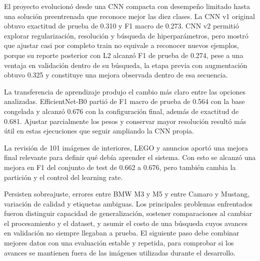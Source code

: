 \documentclass[conference]{IEEEtran}
\begin{document}
El proyecto evolucionó desde una CNN compacta con desempeño limitado hasta una solución preentrenada que reconoce mejor las diez clases. La CNN v1 original obtuvo exactitud de prueba de 0.310 y F1 macro de 0.273. CNN v2 permitió explorar regularización, resolución y búsqueda de hiperparámetros, pero mostró que ajustar casi por completo train no equivale a reconocer nuevos ejemplos, porque su reporte posterior con L2 alcanzó F1 de prueba de 0.274, pese a una ventaja en validación dentro de su búsqueda, la etapa previa con augmentación obtuvo 0.325 y constituye una mejora observada dentro de esa secuencia.

La transferencia de aprendizaje produjo el cambio más claro entre las opciones analizadas. EfficientNet-B0 partió de F1 macro de prueba de 0.564 con la base congelada y alcanzó 0.676 con la configuración final, además de exactitud de 0.681. Ajustar parcialmente los pesos y conservar mayor resolución resultó más útil en estas ejecuciones que seguir ampliando la CNN propia. 

La revisión de 101 imágenes de interiores, LEGO y anuncios aportó una mejora final relevante para definir qué debía aprender el sistema. Con esto se alcanzó una mejora en F1 del conjunto de test de 0.662 a 0.676, pero también cambia la partición y el control del learning rate.

Persisten sobreajuste, errores entre BMW M3 y M5 y entre Camaro y Mustang, variación de calidad y etiquetas ambiguas. Los principales problemas enfrentados fueron distinguir capacidad de generalización, sostener comparaciones al cambiar el procesamiento y el dataset, y asumir el costo de una búsqueda cuyos avances en validación no siempre llegaban a prueba. El siguiente paso debe combinar mejores datos con una evaluación estable y repetida, para comprobar si los avances se mantienen fuera de las imágenes utilizadas durante el desarrollo.
\end{document}
